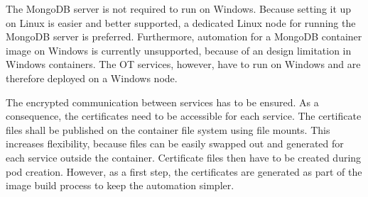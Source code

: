 The MongoDB server is not required to run on \ac{Windows}. Because setting it up on Linux is easier and better supported, a dedicated Linux node for running the MongoDB server is preferred. Furthermore, automation for a MongoDB container image on \ac{Windows} is currently unsupported, because of an design limitation in Windows containers\cite{GitHub.20230317}. The \ac{OT} services, however, have to run on \ac{Windows} and are therefore deployed on a \ac{Windows} node.

The encrypted communication between services has to be ensured. As a consequence, the certificates need to be accessible for each service. The certificate files shall be published on the container file system using file mounts. This increases flexibility, because files can be easily swapped out and generated for each service outside the container. Certificate files then have to be created during pod creation.
However, as a first step, the certificates are generated as part of the image build process to keep the automation simpler.



